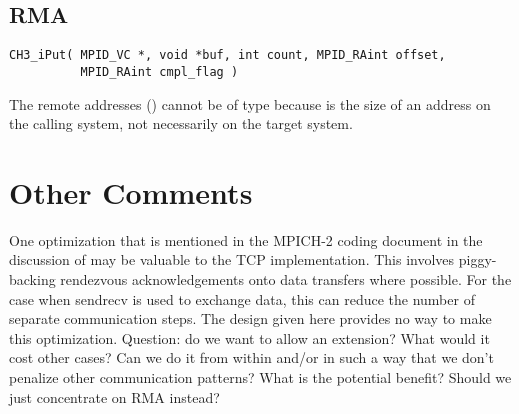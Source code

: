 \documentclass{article}
\begin{document}
\subsection{RMA}
\begin{verbatim}
CH3_iPut( MPID_VC *, void *buf, int count, MPID_RAint offset, 
          MPID_RAint cmpl_flag )
\end{verbatim}
The remote addresses () cannot be of type 
because  
is the size of an address on the calling system, not necessarily on
the target system.  

\section{Other Comments}
One optimization that is mentioned in the MPICH-2 coding document
\cite{mpich2} in the discussion of  may be valuable
to the TCP implementation.  This involves piggy-backing rendezvous
acknowledgements onto data transfers where possible.  For the case
when sendrecv is used to exchange data, this can reduce the number of
separate communication steps.  The design given here provides no way
to make this optimization.  Question: do we want to allow an
extension?  What would it cost other cases?  Can we do it from within
 and/or  in such a way that we
don't penalize other communication patterns?  What is the potential
benefit?  Should we just concentrate on RMA instead?
\end{document}
